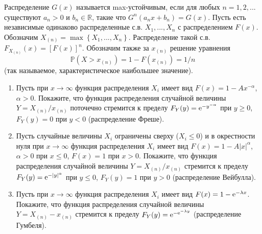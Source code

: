\begin{problem}
Распределение $G\left(x\right)$ называется max-устойчивым, если для любых $n=1,2,...$ существуют $a_{n} >0$ и $b_{n} \in {\mathbb R}$, такие что $G^{n} \left(a_{n} x+b_{n} \right)=G\left(x\right)$.
Пусть есть независимые одинаково распределенные с.в. $X_{1} ,...,X_{n} $ с распределением $F\left(x\right)$. Обозначим $X_{\left(n\right)} =\max \left\{X_{1} ,...,X_{n} \right\}$. Распределение такой с.в. $F_{X_{\left(n\right)} } \left(x\right)=\left[F\left(x\right)\right]^{n} $.
Обозначим также за $x_{(n)}$ решение уравнения $$\mathbb{P}(X>x_{(n)}) = 1-F(x_{(n)}) = 1/n$$ (так называемое, характеристическое наибольшее значение).
\begin{enumerate}
\item Пусть при $x\to\infty$ функция распределения $X_i$ имеет вид $F(x) = 1-Ax^{-\alpha}$, $\alpha>0$. Покажите, что функция распределения случайной величины $Y = X_{(n)}/x_{(n)}$ поточечно стремится к пределу $F_{Y}(y) = {\rm e}^{{-y}^{-\alpha}}$ при $y\geq 0$, $F_{Y}(y) = 0$ при $y<0$ (распределение Фреше).
\item Пусть случайные величины $X_i$ ограничены сверху ($X_i\leq 0$) и в окрестности нуля при $x\to\infty$ функция распределения $X_i$ имеет вид $F(x) = 1-A|x|^{\alpha}$, $\alpha>0$ при $x\leq 0$, $F(x)=1$ при $x>0$. Покажите, что функция распределения случайной величины $Y = X_{(n)}/x_{(n)}$ стремится к пределу $F_{Y}(y) = {\rm e}^{{-|y|}^{\alpha}}$ при $y\leq 0$, $F_{Y}(y) = 1$ при $y>0$ (распределение Вейбулла).
\item Пусть при $x\to\infty$ функция распределения $X_i$ имеет вид $F(x) = 1- {\rm e}^{-\lambda x}$. Покажите, что функция распределения случайной величины $Y = X_{(n)}-x_{(n)}$ стремится к пределу $F_{Y}(y) = {\rm e}^{-{\rm e}^{-\lambda y}}$ (распределение Гумбеля).


\end{enumerate}
\end{problem}
